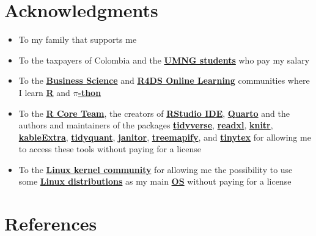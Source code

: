 \documentclass[
  ignorenonframetext,
]{beamer}
\begin{document}
\section{Acknowledgments}\label{acknowledgments}

\begin{frame}{}
\label{section-23}
\begin{itemize}
\item
  To my family that supports me
\item
  To the taxpayers of Colombia and the
  \href{https://www.umng.edu.co/estudiante}{\textbf{UMNG students}} who
  pay my salary
\item
  To the \href{https://www.business-science.io/}{\textbf{Business
  Science}} and \href{https://www.rfordatasci.com/}{\textbf{R4DS Online
  Learning}} communities where I learn
  \href{https://www.r-project.org/about.html}{\textbf{R}} and
  \href{https://www.python.org/about/}{\textbf{\(\pi\)-thon}}
\item
  To the \href{https://www.r-project.org/contributors.html}{\textbf{R
  Core Team}}, the creators of
  \href{https://rstudio.com/products/rstudio/}{\textbf{RStudio IDE}},
  \href{https://quarto.org/}{\textbf{Quarto}} and the authors and
  maintainers of the packages
  \href{https://CRAN.R-project.org/package=tidyverse}{\textbf{tidyverse}},
  \href{https://CRAN.R-project.org/package=readxl}{\textbf{readxl}},
  \href{https://CRAN.R-project.org/package=knitr}{\textbf{knitr}},
  \href{https://CRAN.R-project.org/package=kableExtra}{\textbf{kableExtra}},
  \href{https://CRAN.R-project.org/package=tidyquant}{\textbf{tidyquant}},
  \href{https://CRAN.R-project.org/package=janitor}{\textbf{janitor}},
  \href{https://CRAN.R-project.org/package=treemapify}{\textbf{treemapify}},
  and
  \href{https://CRAN.R-project.org/package=tinytex}{\textbf{tinytex}}
  for allowing me to access these tools without paying for a license
\item
  To the \href{https://www.kernel.org/category/about.html}{\textbf{Linux
  kernel community}} for allowing me the possibility to use some
  \href{https://static.lwn.net/Distributions/}{\textbf{Linux
  distributions}} as my main
  \href{https://en.wikipedia.org/wiki/Operating_system}{\textbf{OS}}
  without paying for a license
\end{itemize}
\end{frame}

\section*{References}\label{references}
\end{document}
